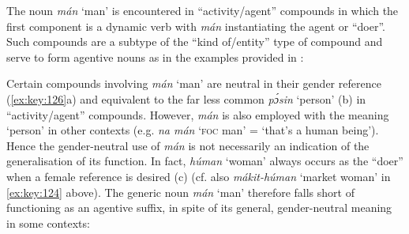 The noun \textit{mán} ‘man’ is encountered in “activity/agent” compounds in which the first component is a dynamic verb with \textit{mán} instantiating the agent or “doer”. Such compounds are a subtype of the “kind of/entity” type of compound and serve to form agentive nouns as in the examples provided in :

Certain compounds involving \textit{mán} ‘man’ are neutral in their gender reference (\ref{ex:key:126}a) and equivalent to the far less common \textit{pɔ́sin} ‘person’ (b) in “activity/agent” compounds. However, \textit{mán} is also employed with the meaning ‘person’ in other contexts (e.g. \textit{na mán} ‘\textsc{foc} man’ = ‘that’s a human being’). Hence the gender-neutral use of \textit{mán} is not necessarily an indication of the generalisation of its function. In fact, \textit{húman} ‘woman’ always occurs as the “doer” when a female reference is desired (c) (cf. also \textit{mákit-húman} ‘market woman’ in \ref{ex:key:124} above). The generic noun \textit{mán} ‘man’ therefore falls short of functioning as an agentive suffix, in spite of its general, gender-neutral meaning in some contexts: 

